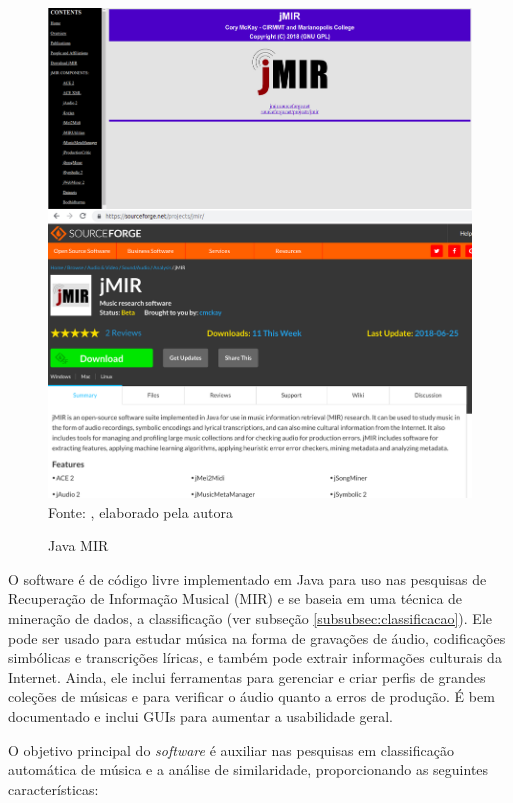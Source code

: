 \begin{figure}[!htb]
   \centering
   \caption{Java MIR}\label{fig:jmir} 
   \includegraphics[scale=0.25]{figuras/jmir.png}
   \\Fonte: \cite{jmir}, elaborado pela autora
\end{figure}

O software é de código livre implementado em Java para uso nas pesquisas de Recuperação de Informação Musical (MIR) e se baseia em uma técnica de mineração de dados, a classificação (ver subseção \ref{subsubsec:classificacao}). Ele pode ser usado para estudar música na forma de gravações de áudio, codificações simbólicas e transcrições líricas, e também pode extrair informações culturais da Internet. Ainda, ele inclui ferramentas para gerenciar e criar perfis de grandes coleções de músicas e para verificar o áudio quanto a erros de produção. É bem documentado e inclui GUIs para aumentar a usabilidade geral.

O objetivo principal do \textit{software} é auxiliar nas pesquisas em classificação automática de música e a análise de similaridade, proporcionando as seguintes características:

